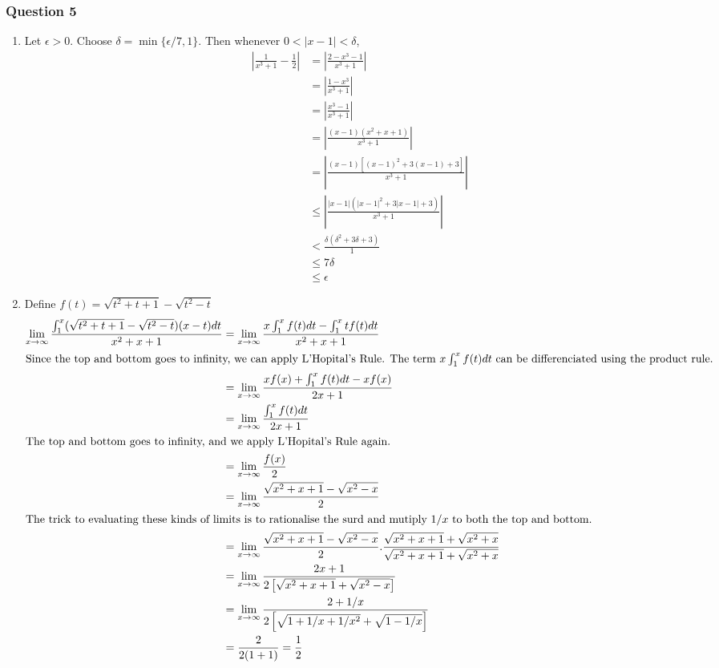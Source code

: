 \documentclass{article}
\begin{document}
\pagebreak
\subsubsection*{Question 5}
\begin{enumerate}[label=\alph*)]
\item Let $\epsilon > 0$. Choose $\delta = \min\{\epsilon/7,1\}$. Then whenever $0<|x-1|<\delta$,
\begin{align*}
    \left|\frac{1}{x^3+1} - \frac{1}{2}\right| &= 
    \left|\frac{2-x^3-1}{x^3+1}\right|\\
    &= \left|\frac{1-x^3}{x^3+1}\right|\\
    &= \left|\frac{x^3-1}{x^3+1}\right|\\
    &= \left|\frac{(x-1)(x^2+x+1)}{x^3+1}\right|\\
    &= \left|\frac{(x-1)[(x-1)^2+3(x-1)+3]}{x^3+1}\right|\\
    &\leq \left|\frac{|x-1|(|x-1|^2+3|x-1|+3)}{x^3+1}\right|\\
    &< \frac{\delta(\delta^2 + 3\delta + 3)}{1}\\
    & \leq 7\delta\\
    & \leq \epsilon
\end{align*}

\item Define $f(t) =\sqrt{t^2+t+1}-\sqrt{t^2-t}$ \\
\begin{align*}
    \lim_{x\to\infty}\frac{\int^x_{1}(\sqrt{t^2+t+1}-\sqrt{t^2-t})(x-t)dt}{x^2+x+1}&=\lim_{x\to\infty}\frac{x\int^x_{1}f(t)dt-\int^x_{1}tf(t)dt}{x^2+x+1}\\
    \intertext{Since the top and bottom goes to infinity, we can apply L'Hopital's Rule. The term $x\int^x_{1}f(t)dt$ can be differenciated using the product rule.}
    &=\lim_{x\to\infty} \frac{xf(x)+\int^x_{1}f(t)dt-xf(x)}{2x+1} \\
    &=\lim_{x\to\infty} \frac{\int^x_{1}f(t)dt}{2x+1}\\
    \intertext{The top and bottom goes to infinity, and we apply L'Hopital's Rule again.}
    &=\lim_{x\to\infty} \frac{f(x)}{2} \\
    &=\lim_{x\to\infty}\frac{\sqrt{x^2+x+1}-\sqrt{x^2-x}}{2}\\
    \intertext{The trick to evaluating these kinds of limits is to rationalise the surd and mutiply $1/x$ to both the top and bottom.}
    &=\lim_{x\to\infty}\frac{\sqrt{x^2+x+1}-\sqrt{x^2-x}}{2} . \frac{\sqrt{x^2+x+1}+\sqrt{x^2+x}}{\sqrt{x^2+x+1}+\sqrt{x^2+x}} \\
    &=\lim_{x\to\infty}\frac{2x+1}{2\left[\sqrt{x^2+x+1}+\sqrt{x^2-x}\right]}\\
    &=\lim_{x\to\infty}\frac{2+1/x}{2\left[\sqrt{1+1/x+1/x^2}+\sqrt{1-1/x}\right]}\\
    &=\frac{2}{2(1+1)}=\frac{1}{2}
\end{align*}
\end{enumerate}
\end{document}
